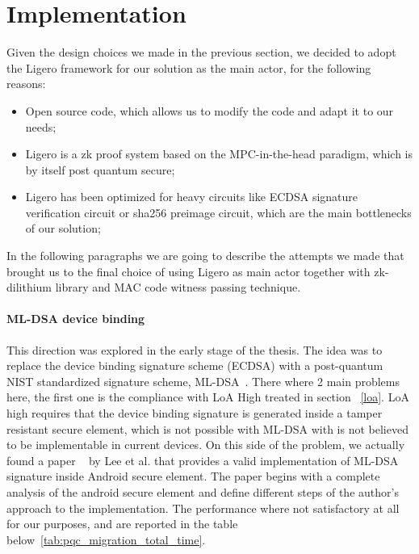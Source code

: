 \documentclass[binding=0.6cm,oneside,noexaminfo]{sapthesis}
\begin{document}
\section{Implementation}
\label{implementation}
Given the design choices we made in the previous section, we decided to adopt the Ligero framework for our solution
as the main actor, for the following reasons:
\begin{itemize}
      \item Open source code, which allows us to modify the code and adapt it to our needs;
      \item Ligero is a zk proof system based on the MPC-in-the-head paradigm, which is by itself post quantum secure;
      \item Ligero has been optimized for heavy circuits like ECDSA signature verification circuit or sha256 preimage circuit,
      which are the main bottlenecks of our solution;
\end{itemize}

In the following paragraphs we are going to describe the attempts we made that brought us to the final choice
of using Ligero as main actor together with zk-dilithium library and MAC code witness passing technique.

\paragraph{ML-DSA device binding}
This direction was explored in the early stage of the thesis. The idea was to replace the device binding signature
scheme (ECDSA) with a post-quantum NIST standardized signature scheme, ML-DSA~\cite{NISTFIPS204}. There where 2 main problems here, the first
one is the compliance with LoA High treated in section ~\ref{loa}. LoA high requires that the device binding signature is generated inside a 
tamper resistant secure element, which is not possible with ML-DSA with is not believed to be implementable in current devices.
On this side of the problem, we actually found a paper ~\cite{Lee2026PQCMigration} by Lee et al. that provides a valid implementation
of ML-DSA signature inside Android secure element.  The paper begins with a complete analysis of the android secure element and define 
different steps of the author's approach to the implementation. The performance where not satisfactory at all for our purposes, and are reported in the 
table below~\ref{tab:pqc_migration_total_time}. 
\end{document}
